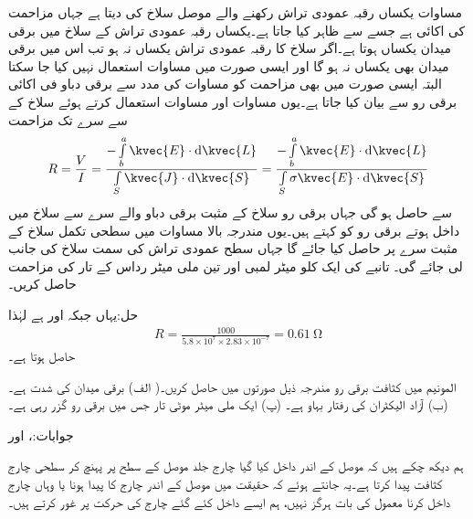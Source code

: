 مساوات  یکساں رقبہ عمودی تراش رکھنے والے موصل سلاخ کی  دیتا ہے جہاں مزاحمت کی اکائی  ہے جسے  سے ظاہر کیا جاتا ہے۔یکساں رقبہ عمودی تراش کے سلاخ میں برقی میدان یکساں ہوتا ہے۔اگر سلاخ کا رقبہ عمودی تراش یکساں نہ ہو تب اس میں برقی میدان بھی یکساں نہ ہو گا اور ایسی صورت میں مساوات  استعمال نہیں کیا جا سکتا البتہ ایسی صورت میں بھی مزاحمت کو مساوات  کی مدد سے برقی دباو فی اکائی برقی رو سے بیان کیا جاتا ہے۔یوں مساوات  اور مساوات  استعمال کرتے ہوئے سلاخ کے   سے  سرے تک مزاحمت
\begin{align}\label{مساوات_کپیسٹر_مزاحمت_کی_عمومی_مساوات}
R=\frac{V}{I}=\frac{-\int \limits_b^a \kvec{E} \cdot \dif \kvec{L}}{\int \limits_S \kvec{J} \cdot \dif \kvec{S}}=\frac{-\int \limits_b^a \kvec{E} \cdot \dif \kvec{L}}{\int \limits_S \sigma \kvec{E} \cdot \dif \kvec{S}}
\end{align} 
سے حاصل ہو گی جہاں برقی رو سلاخ کے مثبت برقی دباو والے سرے سے سلاخ میں داخل ہوتے برقی رو کو کہتے ہیں۔یوں مندرجہ بالا مساوات میں سطحی تکمل سلاخ کے مثبت سرے پر حاصل کیا جائے گا جہاں سطح عمودی تراش کی سمت سلاخ کی جانب لی جائے گی۔
تانبے کی ایک کلو میٹر لمبی اور تین ملی میٹر رداس کے تار کی مزاحمت حاصل کریں۔

حل:یہاں  جبکہ  اور  ہے لہٰذا
\begin{align*}
R=\frac{1000}{5.8\times 10^7 \times 2.83 \times 10^{-7}}=\SI{0.61}{\ohm}
\end{align*}
حاصل ہوتا ہے۔

المونیم میں کثافت برقی رو مندرجہ ذیل صورتوں میں حاصل کریں۔( الف) برقی میدان کی شدت  ہے۔ (ب) آزاد الیکٹران کی رفتار بہاو  ہے۔ (پ) ایک ملی میٹر موٹی تار جس میں  برقی رو گزر رہی ہے۔

جوابات:،   اور 

ہم دیکھ چکے ہیں کہ موصل کے اندر داخل کیا گیا چارج  جلد موصل کے سطح پر پہنچ کر سطحی چارج کثافت پیدا کرتا ہے۔یہ جانتے ہوئے کہ حقیقت میں موصل کے اندر چارج کا پیدا ہونا یا وہاں چارج داخل کرنا معمول کی بات ہرگز نہیں، ہم ایسے داخل کئے گئے چارج کی حرکت پر غور کرتے ہیں۔

